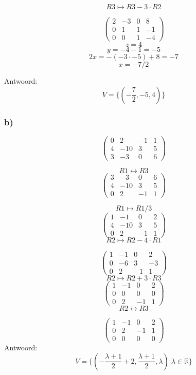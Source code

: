 \documentclass[lineaire_algebra_oplossingen.tex]{subfiles}
\begin{document}
\[ R3 \longmapsto R3 - 3\cdot R2\]

\[
\begin{pmatrix}
2 & -3 & 0 & 8\\
0 & 1 & 1 & -1\\
0 & 0 & 1 & -4
\end{pmatrix}
\]
\[
z = 4\]
\[y = -4-1 = -5\]
\[2x = -(-3\cdot -5) + 8=-7\]
\[ x = -7/2\]

Antwoord:
\[
V = \{(-\frac{7}{2},-5,4)\}
\]

\subsubsection*{b)}
\[
\begin{pmatrix}
0 & 2 & -1 & 1\\
4 & -10 & 3 & 5\\
3 & -3 & 0 & 6
\end{pmatrix}
\]

\[ R1 \leftrightarrow R3\]
\[
\begin{pmatrix}
3 & -3 & 0 & 6\\
4 & -10 & 3 & 5\\
0 & 2 & -1 & 1
\end{pmatrix}
\]

\[ R1 \longmapsto R1 / 3\]
\[
\begin{pmatrix}
1 & -1 & 0 & 2\\
4 & -10 & 3 & 5\\
0 & 2 & -1 & 1
\end{pmatrix}
\]
\[ R2 \longmapsto R2 - 4\cdot R1\]

\[
\begin{pmatrix}
1 & -1 & 0 & 2\\
0 & -6 & 3 & -3\\
0 & 2 & -1 & 1
\end{pmatrix}
\]
\[ R2 \longmapsto R2 + 3\cdot R3\]
\[
\begin{pmatrix}
1 & -1 & 0 & 2\\
0 & 0 & 0 & 0\\
0 & 2 & -1 & 1
\end{pmatrix}
\]
\[ R2 \leftrightarrow R3\]

\[
\begin{pmatrix}
1 & -1 & 0 & 2\\
0 & 2 & -1 & 1\\
0 & 0 & 0 & 0
\end{pmatrix}
\]
Antwoord:
\[
V = \{(-\frac{\lambda+1}{2} + 2,\frac{\lambda+1}{2},\lambda) | \lambda \in \mathbb{R}\}
\]
\end{document}
